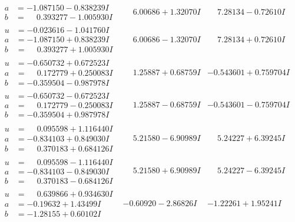 \documentclass[1p]{elsarticle_modified}
\theoremstyle{definition}
\begin{document}
$$\begin{array}{c|c|c}
\begin{aligned}
a &= -1.087150 - 0.838239 I \\
b &= \phantom{-}0.393277 - 1.005930 I\end{aligned}
 & \phantom{-}6.00686 + 1.32070 I & \phantom{-}7.28134 - 0.72610 I \\ \hline\begin{aligned}
u &= -0.023616 - 1.041760 I \\
a &= -1.087150 + 0.838239 I \\
b &= \phantom{-}0.393277 + 1.005930 I\end{aligned}
 & \phantom{-}6.00686 - 1.32070 I & \phantom{-}7.28134 + 0.72610 I \\ \hline\begin{aligned}
u &= -0.650732 + 0.672523 I \\
a &= \phantom{-}0.172779 + 0.250083 I \\
b &= -0.359504 - 0.987978 I\end{aligned}
 & \phantom{-}1.25887 + 0.68759 I & -0.543601 + 0.759704 I \\ \hline\begin{aligned}
u &= -0.650732 - 0.672523 I \\
a &= \phantom{-}0.172779 - 0.250083 I \\
b &= -0.359504 + 0.987978 I\end{aligned}
 & \phantom{-}1.25887 - 0.68759 I & -0.543601 - 0.759704 I \\ \hline\begin{aligned}
u &= \phantom{-}0.095598 + 1.116440 I \\
a &= -0.834103 + 0.849030 I \\
b &= \phantom{-}0.370183 + 0.684126 I\end{aligned}
 & \phantom{-}5.21580 - 6.90989 I & \phantom{-}5.24227 + 6.39245 I \\ \hline\begin{aligned}
u &= \phantom{-}0.095598 - 1.116440 I \\
a &= -0.834103 - 0.849030 I \\
b &= \phantom{-}0.370183 - 0.684126 I\end{aligned}
 & \phantom{-}5.21580 + 6.90989 I & \phantom{-}5.24227 - 6.39245 I \\ \hline\begin{aligned}
u &= \phantom{-}0.639866 + 0.934630 I \\
a &= -0.19632 + 1.43499 I \\
b &= -1.28155 + 0.60102 I\end{aligned}
 & -0.60920 - 2.86826 I & -1.22261 + 1.95241 I \\ \hline\begin{aligned}

\end{aligned}
\end{array}$$
\end{document}
